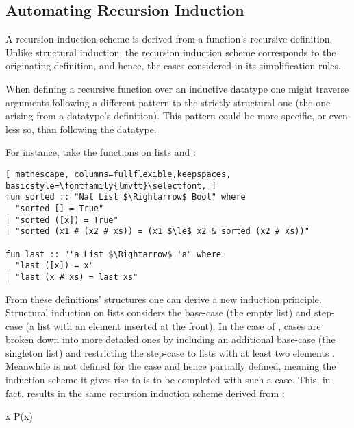 \subsection{Automating Recursion Induction}
\label{sec:rec-ind}

A recursion induction scheme is derived from a function's recursive definition.
%
Unlike structural induction, the recursion induction scheme corresponds to the originating definition, and hence, the cases considered in its simplification rules.

When defining a recursive function over an inductive datatype one might traverse arguments following a different pattern to the strictly structural one (the one arising from a datatype's definition).
%
This pattern could be more specific, or even less so, than following the datatype.

For instance, take the functions on lists  and :

\begin{lstlisting}[ mathescape, columns=fullflexible,keepspaces, basicstyle=\fontfamily{lmvtt}\selectfont, ]
fun sorted :: "Nat List $\Rightarrow$ Bool" where
  "sorted [] = True"
| "sorted ([x]) = True"
| "sorted (x1 # (x2 # xs)) = (x1 $\le$ x2 & sorted (x2 # xs))"

fun last :: "'a List $\Rightarrow$ 'a" where
  "last ([x]) = x"
| "last (x # xs) = last xs"
\end{lstlisting}

\noindent From these definitions' structures one can derive a new induction principle.
%
Structural induction on lists considers the base-case \isaCode{[]} (the empty list) and step-case  (a list with an element inserted at the front).
%
In the case of , cases are broken down into more detailed ones by including an additional base-case \isaCode{[x]} (the singleton list) and restricting the step-case to lists with at least two elements .
%
Meanwhile  is not defined for the case \isaCode{[]} and hence partially defined, meaning the induction scheme it gives rise to is to be completed with such a case.
%
This, in fact, results in the same recursion induction scheme derived from :

\vspace{2 mm}

  {\forall x \;\; P\;(x)}

